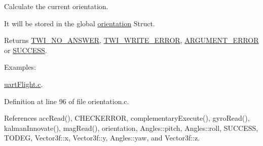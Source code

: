 Calculate the current orientation. 

It will be stored in the global \hyperlink{group__orientation_gacd4a2942520b68691db5aebde4e537a4}{orientation} Struct. \begin{DoxyReturn}{Returns}
\hyperlink{group__error_gga2c3e4bb40f36b262a5214e2da2bca9c5a04d5943ba652af2205c88b247e0c659c}{T\-W\-I\-\_\-\-N\-O\-\_\-\-A\-N\-S\-W\-E\-R}, \hyperlink{group__error_gga2c3e4bb40f36b262a5214e2da2bca9c5ac0e3b3463dcaf220e54794b4711708c9}{T\-W\-I\-\_\-\-W\-R\-I\-T\-E\-\_\-\-E\-R\-R\-O\-R}, \hyperlink{group__error_gga2c3e4bb40f36b262a5214e2da2bca9c5a49ccf277a69dd938c591928aa27c66cc}{A\-R\-G\-U\-M\-E\-N\-T\-\_\-\-E\-R\-R\-O\-R} or \hyperlink{group__error_gga2c3e4bb40f36b262a5214e2da2bca9c5ac7f69f7c9e5aea9b8f54cf02870e2bf8}{S\-U\-C\-C\-E\-S\-S}. 
\end{DoxyReturn}
\begin{Desc}
\item[Examples\-: ]\par
\hyperlink{uart_flight_8c-example}{uart\-Flight.\-c}.\end{Desc}


Definition at line 96 of file orientation.\-c.



References acc\-Read(), C\-H\-E\-C\-K\-E\-R\-R\-O\-R, complementary\-Execute(), gyro\-Read(), kalman\-Innovate(), mag\-Read(), orientation, Angles\-::pitch, Angles\-::roll, S\-U\-C\-C\-E\-S\-S, T\-O\-D\-E\-G, Vector3f\-::x, Vector3f\-::y, Angles\-::yaw, and Vector3f\-::z.



